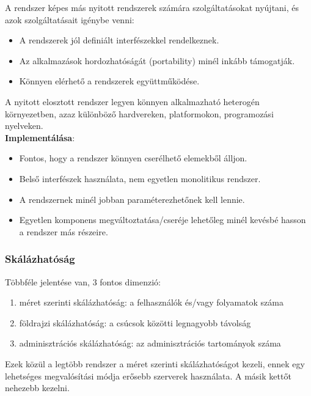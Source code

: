 \documentclass[margin=0px]{article}
\begin{document}
A rendszer képes más nyitott rendszerek számára szolgáltatásokat nyújtani, és azok szolgáltatásait igénybe venni:

\begin{itemize}
    \item	A rendszerek jól definiált interfészekkel rendelkeznek.
    \item	Az alkalmazások hordozhatóságát (portability) minél inkább támogatják.
    \item	Könnyen elérhető a rendszerek együttműködése.
\end{itemize}

\noindent A nyitott elosztott rendszer legyen könnyen alkalmazható heterogén környezetben, azaz
különböző hardvereken, platformokon, programozási nyelveken.\\

\noindent \textbf{Implementálása}:

\begin{itemize}
    \item	Fontos, hogy a rendszer könnyen cserélhető elemekből álljon.
    \item	Belső interfészek használata, nem egyetlen monolitikus rendszer.
    \item	A rendszernek minél jobban paraméterezhetőnek kell lennie.
    \item	Egyetlen komponens megváltoztatása/cseréje lehetőleg minél kevésbé
          hasson a rendszer más részeire.
\end{itemize}

\subsubsection{Skálázhatóság}

Többféle jelentése van, 3 fontos dimenzió:

\begin{enumerate}
    \item	méret szerinti skálázhatóság: a felhasználók és/vagy folyamatok száma
    \item	földrajzi skálázhatóság: a csúcsok közötti legnagyobb távolság
    \item	adminisztrációs skálázhatóság: az adminisztrációs tartományok száma
\end{enumerate}

Ezek közül a legtöbb rendszer a méret szerinti skálázhatóságot kezeli, ennek egy lehetséges megvalósítási
módja erősebb szerverek használata. A másik kettőt nehezebb kezelni.\\
\end{document}
